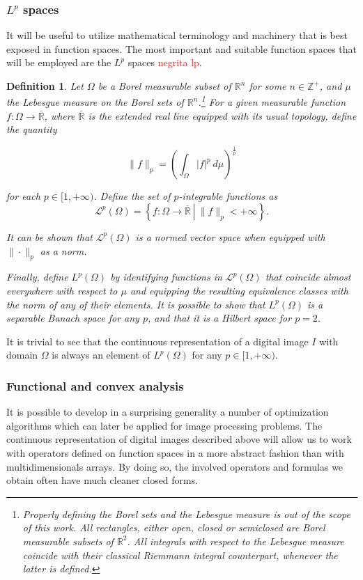 \documentclass[twocolumn,twoside,a4paper,10pt]{IEEEtran}
\newtheorem{definition}{Definition}
\newcommand{\Frank}[1]{\textcolor{red}{#1}}
\begin{document}
\subsubsection{\(L^p\) spaces}
It will be useful to utilize mathematical terminology and machinery that is best exposed in function spaces. The most important and suitable function spaces that will be employed are the \(L^p\) spaces \Frank{negrita lp}.

\begin{definition}
  Let \(\Omega\) be a Borel measurable subset of \(\mathbb{R}^n\) for some \(n\in \mathbb{Z}^+\), and \(\mu\) the Lebesgue measure on the Borel sets of \(\mathbb{R}^n\).\footnote{Properly defining the Borel sets and the Lebesgue measure is out of the scope of this work. All rectangles, either open, closed or semiclosed are Borel measurable subsets of \(\mathbb{R}^2\). All integrals with respect to the Lebesgue measure coincide with their classical Riemmann integral counterpart, whenever the latter is defined.} For a given measurable function \(f\colon \Omega\to \overline{\mathbb{R}}\), where \(\overline{\mathbb{R}}\) is the extended real line equipped with its usual topology, define the quantity

  \[
    \|f\|_{p} = \left(\int_{\Omega}|f|^p~d\mu\right)^{\frac 1p}
  \]

  for each \(p\in[1, +\infty)\). Define the set of \(p\)-integrable functions as 
  \[
    \mathcal{L}^p(\Omega) = \left\{f\colon\Omega\to \mathbb{\overline{R}}~\left|~\|f\|_{p}<+\infty\right.\right\}
  .\]

  It can be shown that \(\mathcal{L}^p(\Omega)\) is a normed vector space when equipped with \(\|\cdot\|_{p}\) as a norm.

  Finally, define \(L^p(\Omega)\) by identifying functions in \(\mathcal{L}^p(\Omega)\) that coincide almost everywhere with respect to \(\mu\) and equipping the resulting equivalence classes with the norm of any of their elements. It is possible to show that \(L^p(\Omega)\) is a separable Banach space for any \(p\), and that it is a Hilbert space for \(p=2\).
\end{definition}

It is trivial to see that the continuous representation of a digital image \(I\) with domain \(\Omega\) is always an element of \(L^p(\Omega)\) for any \(p\in[1, +\infty)\).

\subsubsection{Functional and convex analysis} It is possible to develop in a surprising generality a number of optimization algorithms which can later be applied for image processing problems. The continuous representation of digital images described above will allow us to work with operators defined on function spaces in a more abstract fashion than with multidimensionals arrays. By doing so, the involved operators and formulas we obtain often have much cleaner closed forms.
\end{document}
